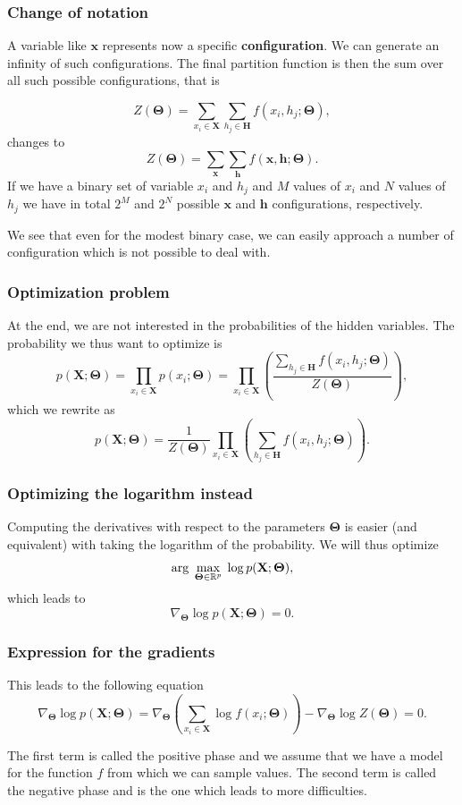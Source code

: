 \documentclass[11pt]{beamer} %
\begin{document}
\begin{frame}
\frametitle{Change of notation}

A variable like $\mathbf{x}$
represents now a specific \textbf{configuration}. We can generate an infinity
of such configurations. The final partition function is then the sum
over all such possible configurations, that is

\[
Z(\mathbf{\Theta})=\sum_{x_i\in \mathbf{X}}\sum_{h_j\in \mathbf{H}} f(x_i,h_j;\mathbf{\Theta}),
\]
changes to
\[
Z(\mathbf{\Theta})=\sum_{\mathbf{x}}\sum_{\mathbf{h}} f(\mathbf{x},\mathbf{h};\mathbf{\Theta}).
\]
If we have a binary set of variable $x_i$ and $h_j$ and $M$ values of $x_i$ and $N$ values of $h_j$ we have in total $2^M$ and $2^N$ possible $\mathbf{x}$ and $\mathbf{h}$ configurations, respectively.

We see that even for the modest binary case, we can easily approach a
number of configuration which is not possible to deal with.
\end{frame}

\begin{frame}
\frametitle{Optimization problem}

At the end, we are not interested in the probabilities of the hidden variables. The probability we thus want to optimize is 
\[
p(\mathbf{X};\mathbf{\Theta})=\prod_{x_i\in \mathbf{X}}p(x_i;\mathbf{\Theta})=\prod_{x_i\in \mathbf{X}}\left(\frac{\sum_{h_j\in \mathbf{H}}f(x_i,h_j;\mathbf{\Theta})}{Z(\mathbf{\Theta})}\right),
\]
which we rewrite as
\[
p(\mathbf{X};\mathbf{\Theta})=\frac{1}{Z(\mathbf{\Theta})}\prod_{x_i\in \mathbf{X}}\left(\sum_{h_j\in \mathbf{H}}f(x_i,h_j;\mathbf{\Theta})\right).
\]
\end{frame}

\begin{frame}
\frametitle{Optimizing the logarithm instead}

Computing the derivatives with respect to the parameters $\mathbf{\Theta}$ is
easier (and equivalent) with taking the logarithm of the
probability. We will thus optimize
\[
{\displaystyle \mathrm{arg} \hspace{0.1cm}\max_{\mathbf{\mathbf{\Theta}}\in {\mathbb{R}}^{p}}} \hspace{0.1cm}\log{p(\mathbf{X};\mathbf{\Theta})},
\]
which leads to
\[
\nabla_{\mathbf{\Theta}}\log{p(\mathbf{X};\mathbf{\Theta})}=0.
\]
\end{frame}

\begin{frame}
\frametitle{Expression for the gradients}

This leads to the following equation
\[
\nabla_{\mathbf{\Theta}}\log{p(\mathbf{X};\mathbf{\Theta})}=\nabla_{\mathbf{\Theta}}\left(\sum_{x_i\in \mathbf{X}}\log{f(x_i;\mathbf{\Theta})}\right)-\nabla_{\mathbf{\Theta}}\log{Z(\mathbf{\Theta})}=0.
\]

The first term is called the positive phase and we assume that we have a model for the function $f$ from which we can sample values. 
The second term is called the negative phase and is the one which leads to more difficulties.
\end{frame}
\end{document}
